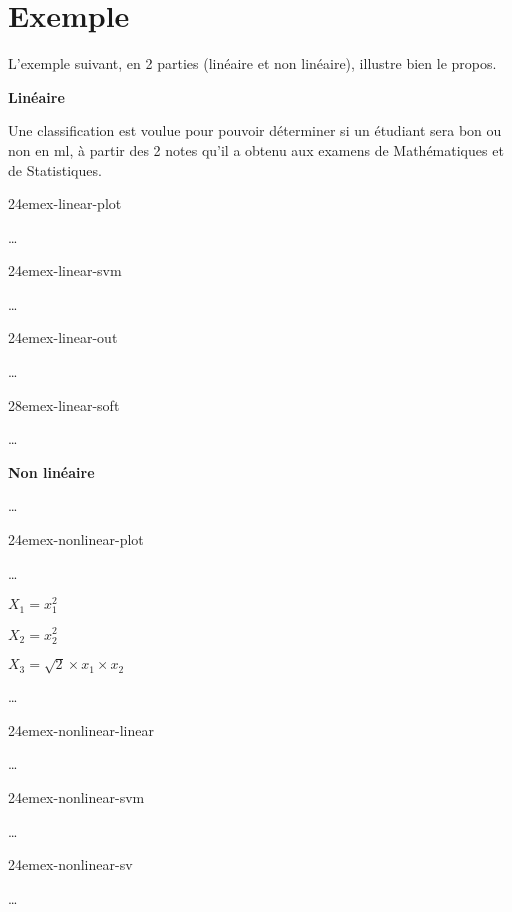 \section{Exemple}

L’exemple suivant, en 2 parties (linéaire et non linéaire),
illustre bien le propos.

\textbf{Linéaire} \cite{ex-linear}

Une classification est voulue pour pouvoir déterminer si un étudiant
sera bon ou non en \gls{ml}, à partir des 2 notes qu’il a obtenu
aux examens de Mathématiques et de Statistiques.

{24em}{ex-linear-plot}

…

{24em}{ex-linear-svm}

…

{24em}{ex-linear-out}

…

{28em}{ex-linear-soft}

…

\pagebreak

\textbf{Non linéaire} \cite{ex-nonlinear}

…

{24em}{ex-nonlinear-plot}

…

{\LARGE
$X_{1}=x_{1}^{2}$

$X_{2}=x_{2}^{2}$

$X_{3}=\sqrt{2} × x_{1} × x_{2}$
}

…

{24em}{ex-nonlinear-linear}

…

{24em}{ex-nonlinear-svm}

…

{24em}{ex-nonlinear-sv}

…

\pagebreak
